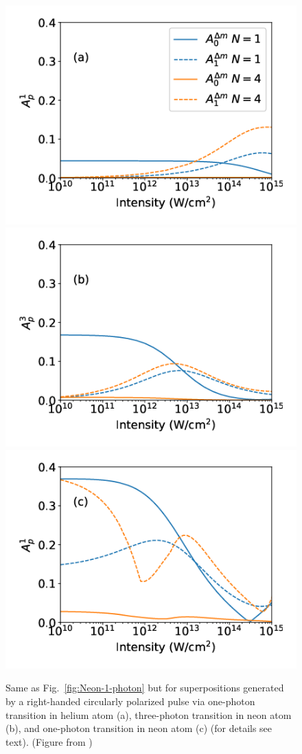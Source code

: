 \begin{figure}[!ht]
\centering
\includegraphics[width=0.32\linewidth]{figs/Photo_ionization/GAP/He_2p1.png}
\includegraphics[width=0.32\linewidth]{figs/Photo_ionization/GAP/Ne_2p-1_3d2_3p-combined.png}
\includegraphics[width=0.32\linewidth]{figs/Photo_ionization/GAP/Ne_2p-1_3d0_1p-combined.png}
\caption{
Same as Fig.~\ref{fig:Neon-1-photon} but for
superpositions generated by a right-handed circularly polarized pulse
via one-photon transition in helium atom (a),  
three-photon transition in neon atom (b), and 
one-photon transition in neon atom (c) (for details see text). (Figure from \cite{venzke2020_GAP})
} 
  \label{fig:combined_data}
\end{figure}

